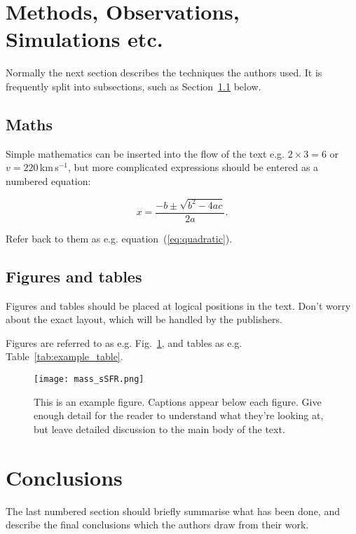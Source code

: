 \documentclass[fleqn,usenatbib]{mnras}
\begin{document}
\section{Methods, Observations, Simulations etc.}

Normally the next section describes the techniques the authors used.
It is frequently split into subsections, such as Section~\ref{sec:maths} below.

\subsection{Maths}
\label{sec:maths} %

Simple mathematics can be inserted into the flow of the text e.g. $2\times3=6$
or $v=220$\,km\,s$^{-1}$, but more complicated expressions should be entered
as a numbered equation:

\begin{equation}
    x=\frac{-b\pm\sqrt{b^2-4ac}}{2a}.
	\label{eq:quadratic}
\end{equation}

Refer back to them as e.g. equation~(\ref{eq:quadratic}).

\subsection{Figures and tables}

Figures and tables should be placed at logical positions in the text. Don't
worry about the exact layout, which will be handled by the publishers.

Figures are referred to as e.g. Fig.~\ref{fig:example_figure}, and tables as
e.g. Table~\ref{tab:example_table}.

\begin{figure}
	\texttt{[image: mass\_sSFR.png]}
    \caption{This is an example figure. Captions appear below each figure.
	Give enough detail for the reader to understand what they're looking at,
	but leave detailed discussion to the main body of the text.}
    \label{fig:example_figure}
\end{figure}



\section{Conclusions}

The last numbered section should briefly summarise what has been done, and describe
the final conclusions which the authors draw from their work.
\end{document}
